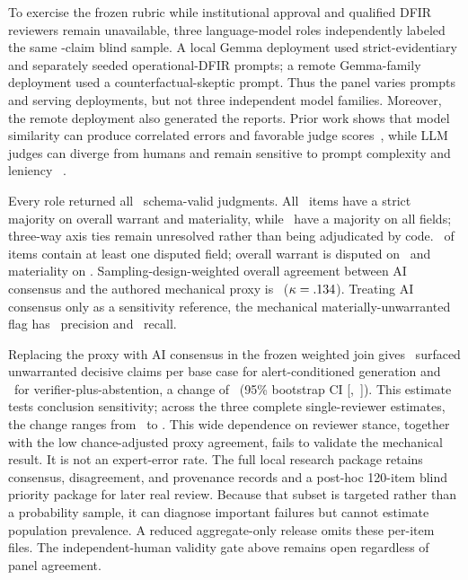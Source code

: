 \documentclass[letterpaper,twocolumn,10pt]{article}
\begin{document}
To exercise the frozen rubric while institutional approval and qualified DFIR
reviewers remain unavailable, three language-model roles independently labeled
the same \SimPanelClaims-claim blind sample.  A local Gemma deployment used
strict-evidentiary and separately seeded operational-DFIR prompts; a remote
Gemma-family deployment used a counterfactual-skeptic prompt.  Thus the panel
varies prompts and serving deployments, but not three independent model
families.  Moreover, the remote deployment also generated the reports.
Prior work shows that model similarity can produce correlated errors and
favorable judge scores~\cite{goel2025great}, while LLM judges can diverge from
humans and remain sensitive to prompt complexity and leniency
~\cite{thakur2025judges}.

Every role returned all \SimPanelClaims\ schema-valid judgments.  All
\SimPanelCoreConsensusClaims\ items have a strict majority on overall warrant
and materiality, while \SimPanelCompleteConsensusClaims\ have a majority on
all fields; three-way axis ties remain unresolved rather than being
adjudicated by code.  \SimPanelAnyDisagreement\ of items contain at least one
disputed field; overall warrant is disputed on
\SimPanelOverallDisagreement\ and materiality on
\SimPanelMaterialityDisagreement.  Sampling-design-weighted overall agreement
between AI consensus and the authored mechanical proxy is
\SimMechanicalWeightedAgreement\ ($\kappa=.134$).
Treating AI consensus only as a sensitivity reference, the mechanical
materially-unwarranted flag has \SimFlagPrecision\ precision and
\SimFlagRecall\ recall.

Replacing the proxy with AI consensus in the frozen weighted join gives
\SimPrimaryAlertsUnsafeExposure\ surfaced unwarranted decisive claims per base
case for alert-conditioned generation and
\SimPrimaryAbstainUnsafeExposure\ for verifier-plus-abstention, a change of
\SimPrimaryUnsafeDifference\ (95\% bootstrap CI
[\SimPrimaryUnsafeCILow,~\SimPrimaryUnsafeCIHigh]).  This estimate tests
conclusion sensitivity; across the three complete single-reviewer estimates,
the change ranges from \SimReviewerUnsafeDifferenceLow\ to
\SimReviewerUnsafeDifferenceHigh.  This wide dependence on reviewer stance,
together with the low chance-adjusted proxy agreement, fails to validate the
mechanical result.  It is not an expert-error rate.  The full local research
package retains consensus, disagreement, and provenance records and a
post-hoc 120-item blind priority package for later real review.  Because that
subset is targeted rather than a probability sample, it can diagnose
important failures but cannot estimate population prevalence.  A reduced
aggregate-only release omits these per-item files.  The independent-human
validity gate above remains open regardless of panel agreement.
\fi
\end{document}

